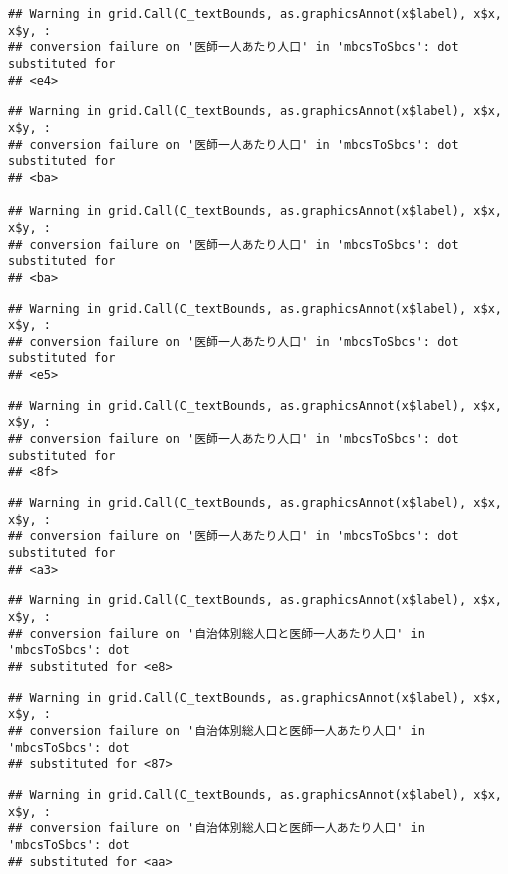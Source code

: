 \documentclass[
]{article}
\begin{document}
\begin{verbatim}
## Warning in grid.Call(C_textBounds, as.graphicsAnnot(x$label), x$x, x$y, :
## conversion failure on '医師一人あたり人口' in 'mbcsToSbcs': dot substituted for
## <e4>
\end{verbatim}

\begin{verbatim}
## Warning in grid.Call(C_textBounds, as.graphicsAnnot(x$label), x$x, x$y, :
## conversion failure on '医師一人あたり人口' in 'mbcsToSbcs': dot substituted for
## <ba>

## Warning in grid.Call(C_textBounds, as.graphicsAnnot(x$label), x$x, x$y, :
## conversion failure on '医師一人あたり人口' in 'mbcsToSbcs': dot substituted for
## <ba>
\end{verbatim}

\begin{verbatim}
## Warning in grid.Call(C_textBounds, as.graphicsAnnot(x$label), x$x, x$y, :
## conversion failure on '医師一人あたり人口' in 'mbcsToSbcs': dot substituted for
## <e5>
\end{verbatim}

\begin{verbatim}
## Warning in grid.Call(C_textBounds, as.graphicsAnnot(x$label), x$x, x$y, :
## conversion failure on '医師一人あたり人口' in 'mbcsToSbcs': dot substituted for
## <8f>
\end{verbatim}

\begin{verbatim}
## Warning in grid.Call(C_textBounds, as.graphicsAnnot(x$label), x$x, x$y, :
## conversion failure on '医師一人あたり人口' in 'mbcsToSbcs': dot substituted for
## <a3>
\end{verbatim}

\begin{verbatim}
## Warning in grid.Call(C_textBounds, as.graphicsAnnot(x$label), x$x, x$y, :
## conversion failure on '自治体別総人口と医師一人あたり人口' in 'mbcsToSbcs': dot
## substituted for <e8>
\end{verbatim}

\begin{verbatim}
## Warning in grid.Call(C_textBounds, as.graphicsAnnot(x$label), x$x, x$y, :
## conversion failure on '自治体別総人口と医師一人あたり人口' in 'mbcsToSbcs': dot
## substituted for <87>
\end{verbatim}

\begin{verbatim}
## Warning in grid.Call(C_textBounds, as.graphicsAnnot(x$label), x$x, x$y, :
## conversion failure on '自治体別総人口と医師一人あたり人口' in 'mbcsToSbcs': dot
## substituted for <aa>
\end{verbatim}
\end{document}
